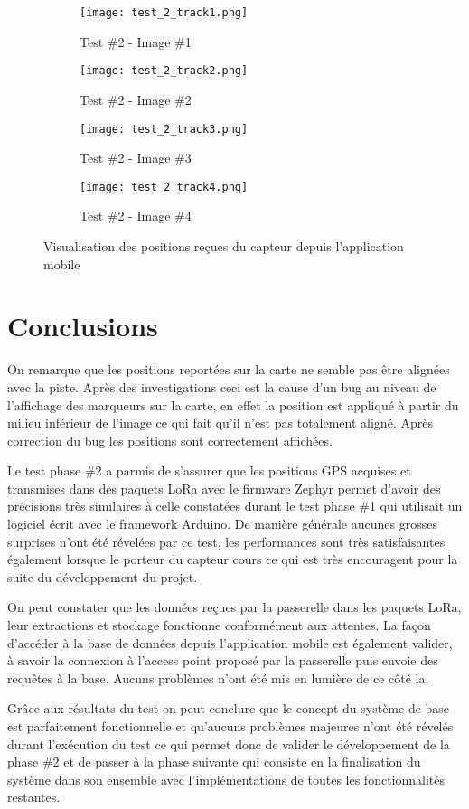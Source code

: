 \begin{figure}[htb]
\centering
\begin{subfigure}{.5\textwidth}
  \centering
  \texttt{[image: test\_2\_track1.png]}
  \caption{Test \#2 - Image \#1}
  \label{fig:test_2_track1}
\end{subfigure}%
\begin{subfigure}{.5\textwidth}
  \centering
  \texttt{[image: test\_2\_track2.png]}
  \caption{Test \#2 - Image \#2}
  \label{fig:test_2_track2}
\end{subfigure}
\begin{subfigure}{.5\textwidth}
  \centering
  \texttt{[image: test\_2\_track3.png]}
  \caption{Test \#2 - Image \#3}
  \label{fig:test_2_track3}
\end{subfigure}%
\begin{subfigure}{.5\textwidth}
  \centering
  \texttt{[image: test\_2\_track4.png]}
  \caption{Test \#2 - Image \#4}
  \label{fig:test_2_track4}
\end{subfigure}
\caption{Visualisation des positions reçues du capteur depuis l'application mobile}
\label{fig:test_2}
\end{figure}

\section{Conclusions}

On remarque que les positions reportées sur la carte ne semble pas être alignées avec la piste. Après des investigations ceci est la cause d'un bug au niveau de l'affichage des marqueurs sur la carte, en effet la position est appliqué à partir du milieu inférieur de l'image ce qui fait qu'il n'est pas totalement aligné. Après correction du bug les positions sont correctement affichées.

Le test phase \#2 a parmis de s'assurer que les positions GPS acquises et transmises dans des paquets LoRa avec le firmware Zephyr permet d'avoir des précisions très similaires à celle constatées durant le test phase \#1 qui utilisait un logiciel écrit avec le framework Arduino. De manière générale aucunes grosses surprises n'ont été révelées par ce test, les performances sont très satisfaisantes également lorsque le porteur du capteur cours ce qui est très encouragent pour la suite du développement du projet.

On peut constater que les données reçues par la passerelle dans les paquets LoRa, leur extractions et stockage fonctionne conformément aux attentes. La façon d'accéder à la base de données depuis l'application mobile est également valider, à savoir la connexion à l'access point proposé par la passerelle puis envoie des requêtes à la base. Aucuns problèmes n'ont été mis en lumière de ce côté la.

Grâce aux résultats du test on peut conclure que le concept du système de base est parfaitement fonctionnelle et qu'aucuns problèmes majeures n'ont été révelés durant l'exécution du test ce qui permet donc de valider le développement de la phase \#2 et de passer à la phase suivante qui consiste en la finalisation du système dans son ensemble avec l'implémentations de toutes les fonctionnalités restantes.
